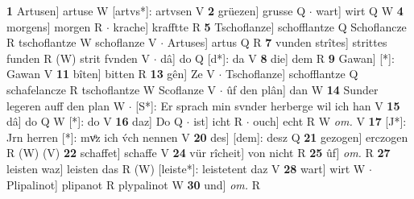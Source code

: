\documentclass[8pt,a4paper,notitlepage]{article}
\begin{document}
\begin{table}[ht]
\begin{minipage}[t]{0.5\linewidth}
\textbf{1} Artusen] artuse W [artvs*]: artvsen V \textbf{2} grüezen] grusse Q  $\cdot$ wart] wirt Q W \textbf{4} morgens] morgen R  $\cdot$ krache] krafftte R \textbf{5} Tschoflanze] schofflantze Q Schoflancze R tschoflantze W schoflanze V  $\cdot$ Artuses] artus Q R \textbf{7} vunden strîtes] strittes funden R (W) strit fvnden V  $\cdot$ dâ] do Q [d*]: da V \textbf{8} die] dem R \textbf{9} Gawan] [*]: Gawan V \textbf{11} bîten] bitten R \textbf{13} gên] Ze V  $\cdot$ Tschoflanze] schofflantze Q schafelancze R tschoflantze W Scoflanze V  $\cdot$ ûf den plân] dan W \textbf{14} Sunder legeren auff den plan W  $\cdot$ [S*]: Er sprach min svnder herberge wil ich han V \textbf{15} dâ] do Q W [*]: do V \textbf{16} daz] Do Q  $\cdot$ ist] icht R  $\cdot$ ouch] echt R W \textit{om.} V \textbf{17} [J*]: Jrn herren [*]: mvͦz ich v́ch nennen V \textbf{20} des] [dem]: desz Q \textbf{21} gezogen] erczogen R (W) (V) \textbf{22} schaffet] schaffe V \textbf{24} vür rîcheit] von nicht R \textbf{25} ûf] \textit{om.} R \textbf{27} leisten waz] leisten das R (W) [leiste*]: leistetent daz  V \textbf{28} wart] wirt W  $\cdot$ Plipalinot] plipanot R plypalinot W \textbf{30} und] \textit{om.} R \newline
\end{minipage}
\end{table}
\end{document}
